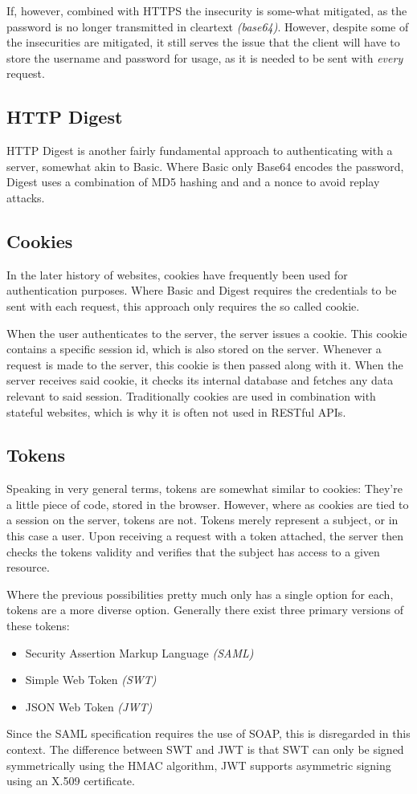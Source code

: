 			If, however, combined with HTTPS the insecurity is some-what mitigated, as the password is no longer transmitted in cleartext \emph{(base64)}. However, despite some of the insecurities are mitigated, it still serves the issue that the client will have to store the username and password for usage, as it is needed to be sent with \emph{every} request.

		\subsection{HTTP Digest}
			HTTP Digest is another fairly fundamental approach to authenticating with a server, somewhat akin to Basic. Where Basic only Base64 encodes the password, Digest uses a combination of MD5 hashing and and a nonce to avoid replay attacks. 

		\subsection{Cookies}
			In the later history of websites, cookies have frequently been used for authentication purposes. Where Basic and Digest requires the credentials to be sent with each request, this approach only requires the so called cookie.

			When the user authenticates to the server, the server issues a cookie. This cookie contains a specific session id, which is also stored on the server. Whenever a request is made to the server, this cookie is then passed along with it. When the server receives said cookie, it checks its internal database and fetches any data relevant to said session. Traditionally cookies are used in combination with stateful websites, which is why it is often not used in RESTful APIs.

		\subsection{Tokens}
			Speaking in very general terms, tokens are somewhat similar to cookies: They're a little piece of code, stored in the browser. However, where as cookies are tied to a session on the server, tokens are not. Tokens merely represent a subject, or in this case a user. Upon receiving a request with a token attached, the server then checks the tokens validity and verifies that the subject has access to a given resource.

			Where the previous possibilities pretty much only has a single option for each, tokens are a more diverse option. Generally there exist three primary versions of these tokens:
			\begin{itemize}
				\item Security Assertion Markup Language \emph{(SAML)}
				\item Simple Web Token \emph{(SWT)}
				\item JSON Web Token \emph{(JWT)}
			\end{itemize}
			Since the SAML specification requires the use of SOAP, this is disregarded in this context. The difference between SWT and JWT is that SWT can only be signed symmetrically using the HMAC algorithm, JWT supports asymmetric signing using an X.509 certificate\cite{auth0_jwt}.


